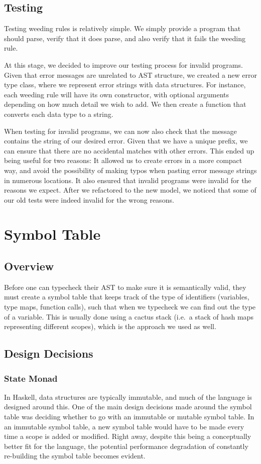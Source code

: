 \documentclass[11pt]{article}
\begin{document}
\subsection{Testing}

Testing weeding rules is relatively simple.
We simply provide a program that should parse, verify that it does parse,
and also verify that it fails the weeding rule.

At this stage, we decided to improve our testing process for invalid programs.
Given that error messages are unrelated to AST structure, we created a new error type class, where we represent error strings with data structures.
For instance, each weeding rule will have its own constructor, with optional arguments depending on how much detail we wish to add.
We then create a function that converts each data type to a string.

When testing for invalid programs, we can now also check that the message contains the string of our desired error.
Given that we have a unique prefix, we can ensure that there are no accidental matches with other errors.
This ended up being useful for two reasons: It allowed us to create errors in a more compact way, and avoid the possibility of making typos when pasting error message strings in numerous locations.
It also ensured that invalid programs were invalid for the reasons we expect.
After we refactored to the new model, we noticed that some of our old tests were indeed invalid for the wrong reasons.

\section{Symbol Table}
\subsection{Overview}
Before one can typecheck their AST to make sure it is semantically
valid, they must create a symbol table that keeps track of the type of
identifiers (variables, type maps, function calls), such that when we
typecheck we can find out the type of a variable. This is usually done
using a cactus stack (i.e.\ a stack of hash maps representing
different scopes), which is the approach we used as well.
\subsection{Design Decisions}

\subsubsection{State Monad}
In Haskell, data structures are typically immutable, and much of the
language is designed around this. One of the main design decisions
made around the symbol table was deciding whether to go with an
immutable or mutable symbol table. In an immutable symbol table, a new
symbol table would have to be made every time a scope is added or
modified. Right away, despite this being a conceptually better fit for
the language, the potential performance degradation of constantly
re-building the symbol table becomes evident.
\end{document}
